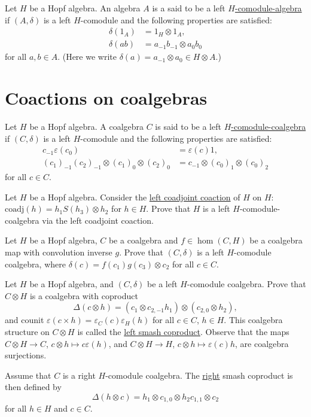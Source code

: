 \begin{definition}
Let $H$ be a Hopf algebra. An algebra $A$ is a said to be a left
\underline{$H$-comodule-algebra} if $(A,\delta)$ is a left $H$-comodule and the
following properties are satisfied:
\begin{align*}
\delta(1_{A}) & =1_{H}\otimes1_{A},\\
\delta(ab) & =a_{-1}b_{-1}\otimes a_{0}b_{0}
\end{align*}
for all $a,b\in A$. (Here we write $\delta(a)=a_{-1}\otimes a_{0}\in H\otimes A$.)
\end{definition}

\section{Coactions on coalgebras}

\begin{definition}
Let $H$ be a Hopf algebra. A coalgebra $C$ is said to be a left
\underline{$H$-comodule-coalgebra} if $(C,\delta)$ is a left $H$-comodule and
the following properties are satisfied:
\begin{align*}
c_{-1}\varepsilon(c_{0}) & =\varepsilon(c)1,\\
(c_{1})_{-1}(c_{2})_{-1}\otimes(c_{1})_{0}\otimes(c_{2})_{0} & =c_{-1}\otimes(c_{0})_{1}\otimes(c_{0})_{2}
\end{align*}
for all $c\in C$.
\end{definition}

\begin{exercise}
Let $H$ be a Hopf algebra. Consider the \underline{left coadjoint coaction}
of $H$ on $H$: $\mathrm{coadj}(h)=h_{1}S(h_{3})\otimes h_{2}$ for $h\in H$. Prove that 
$H$ is a left $H$-comodule-coalgebra via the left coadjoint coaction.
\end{exercise}

\begin{exercise}
Let $H$ be a Hopf algebra, $C$ be a coalgebra and $f\in\hom(C,H)$
be a coalgebra map with convolution inverse $g$. Prove that $(C,\delta)$
is a left $H$-comodule coalgebra, where $\delta(c)=f(c_{1})g(c_{3})\otimes c_{2}$
for all $c\in C$. 
\end{exercise}

\begin{exercise}
\label{exercise:smash_coleft}
Let $H$ be a Hopf algebra, and $(C,\delta)$ be a left $H$-comodule
coalgebra. Prove that $C\otimes H$ is a coalgebra with coproduct
\[
\Delta(c\otimes h)=\left(c_{1}\otimes c_{2,-1}h_{1}\right)\otimes\left(c_{2,0}\otimes h_{2}\right),
\]
and counit $\varepsilon(c\times h)=\varepsilon_{C}(c)\varepsilon_{H}(h)$ for
all $c\in C$, $h\in H$. This coalgebra structure on $C\otimes H$ is called the
\underline{left smash coproduct}. Observe that the maps $C\otimes H\to C$,
$c\otimes h\mapsto c\varepsilon(h)$, and $C\otimes H\to H$, $c\otimes h\mapsto
\varepsilon(c)h$, are coalgebra surjections.
\end{exercise}

Assume that $C$ is a right $H$-comodule coalgebra. The \underline{right}
smash coproduct is then defined by 
\[
\Delta(h\otimes c)=h_{1}\otimes c_{1,0}\otimes h_{2}c_{1,1}\otimes c_{2}
\]
for all $h\in H$ and $c\in C$.

